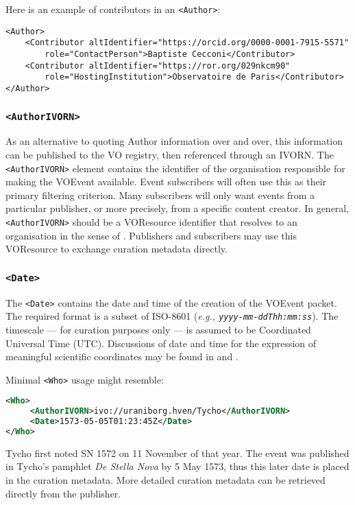 \documentclass[11pt,a4paper]{ivoa}
\begin{document}
Here is an example of contributors in an \verb|<Author>|:
\begin{lstlisting}
<Author>
	<Contributor altIdentifier="https://orcid.org/0000-0001-7915-5571"
	    role="ContactPerson">Baptiste Cecconi</Contributor>
	<Contributor altIdentifier="https://ror.org/029nkcm90"
	    role="HostingInstitution">Observatoire de Paris</Contributor>
</Author>
\end{lstlisting}

\subsubsection{\texttt{<AuthorIVORN>}}
As an alternative to quoting Author information over and over, this information
can be published to the VO registry, then referenced through an IVORN.
The \verb|<AuthorIVORN>| element contains the identifier of the organisation responsible
for making the VOEvent available. Event subscribers will often use this as their
primary filtering criterion. Many subscribers will only want events from a
particular publisher, or more precisely, from a specific content creator. In
general, \verb|<AuthorIVORN>| should be a VOResource identifier that resolves to
an organisation in the sense of \citep{2007ivoa.spec.0302H}. Publishers and
subscribers may use this VOResource to exchange curation metadata directly.

\subsubsection{\texttt{<Date>}}
The \verb|<Date>| contains the date and time of the creation of the VOEvent
packet. The required format is a subset of ISO-8601 (\emph{e.g.,
\texttt{yyyy-mm-ddThh:mm:ss}}). The timescale --- for curation purposes only --- is
assumed to be Coordinated Universal Time (UTC). Discussions of date and time for
the expression of meaningful scientific coordinates may be found in
\citep{2007ivoa.spec.1030R} and \citep{bib26}.


Minimal \verb|<Who>| usage might resemble:
\begin{lstlisting}[language=XML]
<Who>
     <AuthorIVORN>ivo://uraniborg.hven/Tycho</AuthorIVORN>
     <Date>1573-05-05T01:23:45Z</Date>
</Who>
\end{lstlisting}
Tycho first noted SN 1572 on 11 November of that year. The event was published
in Tycho's pamphlet \emph{De Stella Nova} by 5 May 1573, thus this later date is
placed in the curation metadata. More detailed curation metadata can be
retrieved directly from the publisher.
\end{document}

